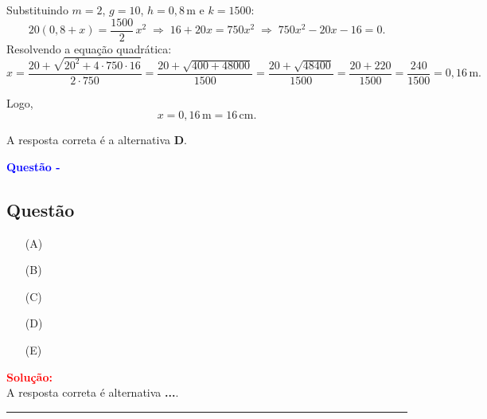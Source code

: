 \begin{flushleft}
Substituindo $m=2$, $g=10$, $h=0{,}8\,\text{m}$ e $k=1500$:
\[
20(0{,}8+x)=\frac{1500}{2}\,x^2
\;\Longrightarrow\;
16+20x=750x^2
\;\Longrightarrow\;
750x^2-20x-16=0.
\]
Resolvendo a equação quadrática:
\[
x=\frac{20+\sqrt{20^2+4\cdot 750\cdot 16}}{2\cdot 750}
=\frac{20+\sqrt{400+48000}}{1500}
=\frac{20+\sqrt{48400}}{1500}
=\frac{20+220}{1500}
=\frac{240}{1500}=0{,}16\,\text{m}.
\]

Logo,
\[
\boxed{x=0{,}16\,\text{m}=16\,\text{cm}}.
\]

\medskip
A resposta correta é a alternativa \colorbox{green!50}{\textbf{D}}.

\end{flushleft}


\begin{flushleft}
\textbf{\textcolor{blue}{\Large Quest\~ao - }}\\
\noindent

\subsection{Quest\~ao }

\begin{itemize}
\item[(A)] 
\item[(B)] 
\item[(C)]
\item[(D)] 
\item[(E)] 
\end{itemize}

\vspace{0.5cm}

\textcolor{red}{\textbf{Solução:}}\\


A resposta correta é alternativa \colorbox{green!50}{\textbf{...}}.

\end{flushleft}

\noindent\rule{\linewidth}{0.6pt}\\
